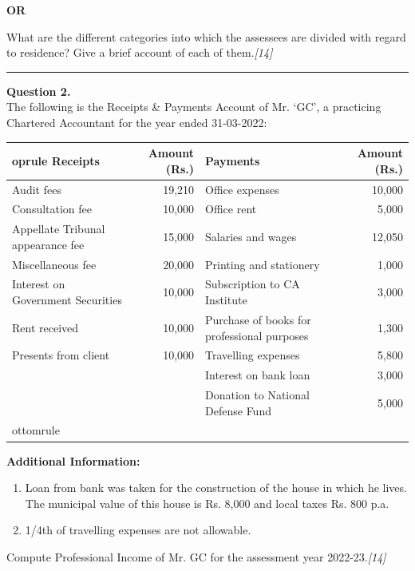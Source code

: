 \documentclass[11pt,a4paper]{article}
\newcommand{\pts}[1]{\hfill   \textit{[#1]}}
\begin{document}
\centerline{   \textbf{OR}}

What are the different categories into which the assessees are divided with regard to residence? Give a brief account of each of them.\pts{14}

\medskip\rule{\linewidth}{0.2pt}

\pagebreak




\noindent   \textbf{Question 2.} \\
The following is the Receipts \& Payments Account of Mr. `GC', a practicing Chartered Accountant for the year ended 31-03-2022:


\begin{table}[h!]
  \centering
  \small
  
\begin{tabular}{lrlr}
     oprule
   \textbf{Receipts} &   \textbf{Amount (Rs.)} &   \textbf{Payments} &   \textbf{Amount (Rs.)} \\
    \midrule
    Audit fees & 19,210 & Office expenses & 10,000 \\
    Consultation fee & 10,000 & Office rent & 5,000 \\
    Appellate Tribunal appearance fee & 15,000 & Salaries and wages & 12,050 \\
    Miscellaneous fee & 20,000 & Printing and stationery & 1,000 \\
    Interest on Government Securities & 10,000 & Subscription to CA Institute & 3,000 \\
    Rent received & 10,000 & Purchase of books for professional purposes & 1,300 \\
    Presents from client & 10,000 & Travelling expenses & 5,800 \\
          &        & Interest on bank loan & 3,000 \\
          &        & Donation to National Defense Fund & 5,000 \\
    ottomrule
  \end{tabular}
\end{table}




\noindent   \textbf{Additional Information:}

\begin{enumerate}[label=(\alph*)]
  \item Loan from bank was taken for the construction of the house in which he lives. The municipal value of this house is Rs. 8,000 and local taxes Rs. 800 p.a.
  \item 1/4th of travelling expenses are not allowable.
\end{enumerate}
Compute Professional Income of Mr. GC for the assessment year 2022-23.\pts{14}
\end{document}
